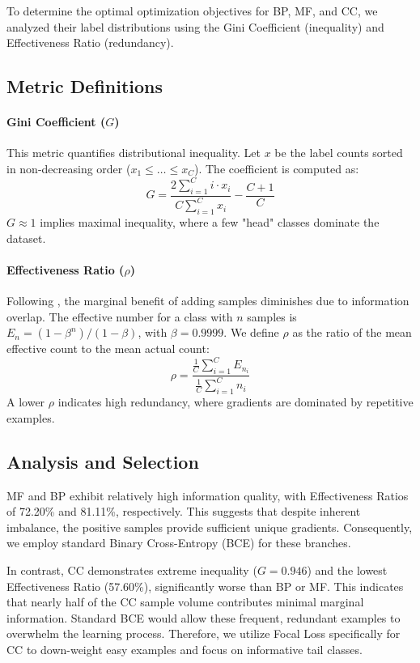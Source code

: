\documentclass{article}
\begin{document}
To determine the optimal optimization objectives for BP, MF, and CC, we analyzed their label distributions using the Gini Coefficient (inequality) and Effectiveness Ratio (redundancy).

\subsection{Metric Definitions}

\paragraph{Gini Coefficient ($G$)}
This metric quantifies distributional inequality. Let $x$ be the label counts sorted in non-decreasing order ($x_1 \le \dots \le x_C$). The coefficient is computed as:
\begin{equation}
    G = \frac{2 \sum_{i=1}^C i \cdot x_i}{C \sum_{i=1}^C x_i} - \frac{C+1}{C}
\end{equation}
$G \approx 1$ implies maximal inequality, where a few "head" classes dominate the dataset.

\paragraph{Effectiveness Ratio ($\rho$)}
Following \cite{cui2019class}, the marginal benefit of adding samples diminishes due to information overlap. The effective number for a class with $n$ samples is $E_n = (1 - \beta^n)/(1 - \beta)$, with $\beta = 0.9999$. We define $\rho$ as the ratio of the mean effective count to the mean actual count:
\begin{equation}
    \rho = \frac{\frac{1}{C}\sum_{i=1}^C E_{n_i}}{\frac{1}{C}\sum_{i=1}^C n_i}
\end{equation}
A lower $\rho$ indicates high redundancy, where gradients are dominated by repetitive examples.

\subsection{Analysis and Selection}

MF and BP exhibit relatively high information quality, with Effectiveness Ratios of 72.20\% and 81.11\%, respectively. This suggests that despite inherent imbalance, the positive samples provide sufficient unique gradients. Consequently, we employ standard Binary Cross-Entropy (BCE) for these branches.

In contrast, CC demonstrates extreme inequality ($G=0.946$) and the lowest Effectiveness Ratio (57.60\%), significantly worse than BP or MF. This indicates that nearly half of the CC sample volume contributes minimal marginal information. Standard BCE would allow these frequent, redundant examples to overwhelm the learning process. Therefore, we utilize Focal Loss specifically for CC to down-weight easy examples and focus on informative tail classes.
\end{document}
